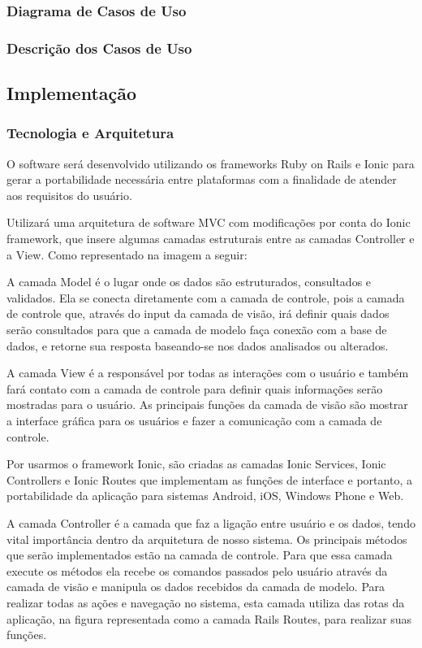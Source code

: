 \subsubsection{Diagrama de Casos de Uso}


\subsubsection{Descrição dos Casos de Uso}


\subsection{Implementação}
\subsubsection{Tecnologia e Arquitetura}
\par O software será desenvolvido utilizando os frameworks Ruby on Rails e Ionic para gerar a portabilidade necessária entre plataformas com a finalidade de atender aos requisitos do usuário.
\par Utilizará uma arquitetura de software MVC com modificações por conta do Ionic framework, que insere algumas camadas estruturais entre as camadas Controller e a View. Como representado na imagem a seguir:


\par A camada Model é o lugar onde os dados são estruturados, consultados e validados. Ela se conecta diretamente com a camada de controle, pois a camada de controle que, através do input da camada de visão, irá definir quais dados serão consultados para que a camada de modelo faça conexão com a base de dados, e retorne sua resposta baseando-se nos dados analisados ou alterados.
\par A camada View é a responsável por todas as interações com o usuário e também fará contato com a camada de controle para definir quais informações serão mostradas para o usuário. As principais funções da camada de visão são mostrar a interface gráfica para os usuários e fazer a comunicação com a camada de controle.
\par Por usarmos o framework Ionic, são criadas as camadas Ionic Services, Ionic Controllers e Ionic Routes que implementam as funções de interface e portanto, a portabilidade da aplicação para sistemas Android, iOS, Windows Phone e Web.
\par A camada Controller é a camada que faz a ligação entre usuário e os dados, tendo vital importância dentro da arquitetura de nosso sistema. Os principais métodos que serão implementados estão na camada de controle. Para que essa camada execute os métodos ela recebe os comandos passados pelo usuário através da camada de visão e manipula os dados recebidos da camada de modelo. Para realizar todas as ações e navegação no sistema, esta camada utiliza das rotas da aplicação, na figura representada como a camada Rails Routes, para realizar suas funções.

